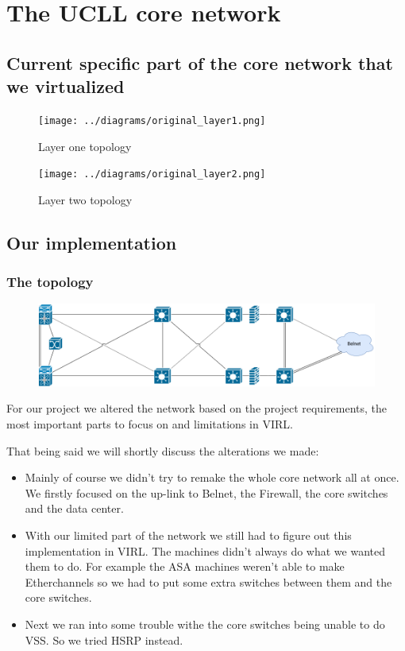 \documentclass{article}
\begin{document}
\newpage
\section{The UCLL core network}
\subsection{Current specific part of the core network that we virtualized}

\begin{figure}[H]
	\centering
	\texttt{[image: ../diagrams/original\_layer1.png]}
	\caption{Layer one topology}
\end{figure}

\begin{figure}[H]
	\centering
	\texttt{[image: ../diagrams/original\_layer2.png]}
	\caption{Layer two topology}
\end{figure}
\newpage
\subsection{Our implementation}
\subsubsection{The topology}

\begin{figure}[H]
	\centering
	\includegraphics[width=\textwidth]{images/topology.png}
\end{figure}

For our project we altered the network based on the project requirements, the most important parts to focus on and limitations in VIRL.

That being said we will shortly discuss the alterations we made:
\begin{itemize}
	\item Mainly of course we didn't try to remake the whole core network all at once.
	We firstly focused on the up-link to Belnet, the Firewall, the core switches and the data center.
	\item With our limited part of the network we still had to figure out this implementation in VIRL.
	The machines didn't always do what we wanted them to do.
	For example the ASA machines weren't able to make Etherchannels so we had to put some extra switches between them and the core switches.
	\item Next we ran into some trouble withe the core switches being unable to do VSS.
	So we tried HSRP instead.
\end{itemize}
\end{document}
